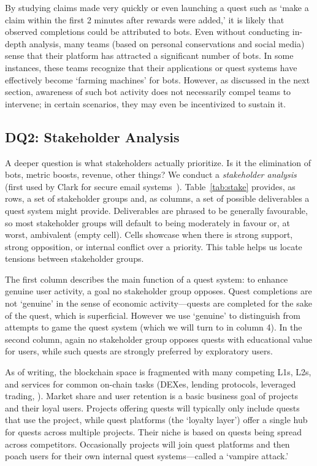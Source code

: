 By studying claims made very quickly or even launching a quest such as `make a claim within the first 2 minutes after rewards were added,' it is likely that observed completions could be attributed to bots. Even without conducting in-depth analysis, many teams (based on personal conservations and social media) sense that their platform has attracted a significant number of bots. In some instances, these teams recognize that their applications or quest systems have effectively become `farming machines' for bots. However, as discussed in the next section, awareness of such bot activity does not necessarily compel teams to intervene; in certain scenarios, they may even be incentivized to sustain it.


\subsection{DQ2: Stakeholder Analysis} 



A deeper question is what stakeholders actually prioritize. Is it the elimination of bots, metric boosts, revenue, other things? We conduct a \textit{stakeholder analysis} (first used by Clark \etal for secure email systems~\cite{CvORSZ21}). Table~\ref{tab:stake} provides, as rows, a set of stakeholder groups and, as columns, a set of possible deliverables a quest system might provide. Deliverables are phrased to be generally favourable, so most stakeholder groups will default to being moderately in favour or, at worst, ambivalent (empty cell). Cells showcase when there is strong support, strong opposition, or internal conflict over a priority. This table helps us locate tensions between stakeholder groups.

The first column describes the main function of a quest system: to enhance genuine user activity, a goal no stakeholder group opposes. Quest completions are not `genuine' in the sense of economic activity---quests are completed for the sake of the quest, which is superficial. However we use `genuine' to distinguish from attempts to game the quest system (which we will turn to in column 4). In the second column, again no stakeholder group opposes quests with educational value for users, while such quests are strongly preferred by exploratory users.

As of writing, the blockchain space is fragmented with many competing L1s, L2s, and services for common on-chain tasks (\eg DEXes, lending protocols, leveraged trading, \etc). Market share and user retention is a basic business goal of projects and their loyal users. Projects offering quests will typically only include quests that use the project, while quest platforms (the `loyalty layer') offer a single hub for quests across multiple projects. Their niche is based on quests being spread across competitors. Occasionally projects will join quest platforms and then poach users for their own internal quest systems---called a `vampire attack.'

